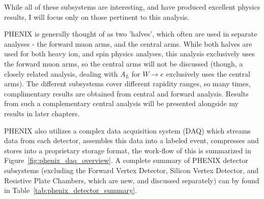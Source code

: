While all of these subsystems are interesting, and have produced excellent
physics results, I will focus only on those pertinent to this analysis.

PHENIX is generally thought of as two 'halves', which often are used in separate
analyses - the forward muon arms, and the central arms. While both halves are
used for both heavy ion, and spin physics analyses, this analysis exclusively
uses the forward muon arms, so the central arms will not be discussed (though, a
closely related analysis, dealing with $A_L$ for $W\rightarrow e$ exclusively
uses the central arms). The different subsystems cover different rapidity
ranges, so many times, complimentary results are obtained from central and
forward analysis. Results from such a complementary central analysis will be
presented alongside my results in later chapters.

PHENIX also utilizes a complex data acquisition system (DAQ) which streams data
from each detector, assembles this data into a labeled event, compresses and
stores into a proprietary storage format, the work-flow of this is summarized in
Figure~\ref{fig:phenix_daq_overview}. A complete summary of PHENIX detector
subsystems (excluding the Forward Vertex Detector, Silicon Vertex Detector, and
Resistive Plate Chambers, which are new, and discussed separately) can by found
in Table~\ref{tab:phenix_detector_summary}.

